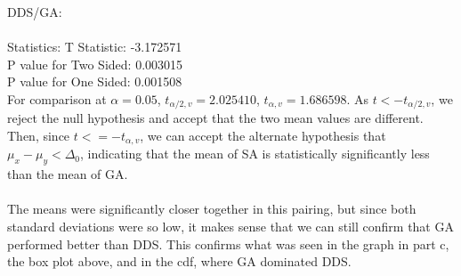 \documentclass[12pt]{article}
\begin{document}
DDS/GA:\\\\
Statistics: T Statistic: -3.172571\\
P value for Two Sided: 0.003015\\
P value for One Sided: 0.001508\\

For comparison at $\alpha = 0.05$, $t_{\alpha/2,v} = 2.025410$, $t_{\alpha, v}  = 1.686598$. As $t < -t_{\alpha/2,v}$, we reject the null hypothesis and accept that the two mean values are different. Then, since $t <= -t_{\alpha, v}$, we can accept the alternate hypothesis that $\mu_x - \mu_y < \Delta_0$, indicating that the mean of SA is statistically significantly less than the mean of GA.\\\\
The means were significantly closer together in this pairing, but since both standard deviations were so low, it makes sense that we can still confirm that GA performed better than DDS. This confirms what was seen in the graph in part c, the box plot above, and in the cdf, where GA dominated DDS.
\end{document}
